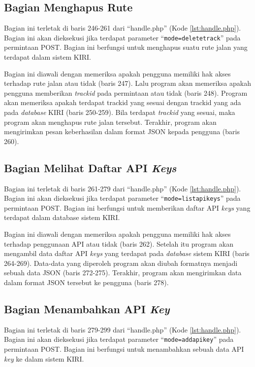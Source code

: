 \subsection{Bagian Menghapus Rute}
\label{sec:hapusrute}
Bagian ini terletak di baris 246-261 dari ``handle.php'' (Kode \ref{lst:handle.php}). Bagian ini akan dieksekusi jika terdapat parameter ``\texttt{mode=deletetrack}'' pada permintaan POST. Bagian ini berfungsi untuk menghapus suatu rute jalan yang terdapat dalam sistem KIRI.

Bagian ini diawali dengan memeriksa apakah pengguna memiliki hak akses terhadap rute jalan atau tidak (baris 247). Lalu program akan memeriksa apakah pengguna memberikan \textit{trackid} pada permintaan atau tidak (baris 248). Program akan memeriksa apakah terdapat {trackid} yang sesuai dengan {trackid} yang ada pada \textit{database} KIRI (baris 250-259). Bila terdapat \textit{trackid} yang sesuai, maka program akan menghapus rute jalan tersebut. Terakhir, program akan mengirimkan pesan keberhasilan dalam format JSON kepada pengguna (baris 260).

\subsection{Bagian Melihat Daftar API \textit{Keys}}
\label{sec:lihatapikeys}
Bagian ini terletak di baris 261-279 dari ``handle.php'' (Kode \ref{lst:handle.php}). Bagian ini akan dieksekusi jika terdapat parameter ``\texttt{mode=listapikeys}'' pada permintaan POST. Bagian ini berfungsi untuk memberikan daftar API \textit{keys} yang terdapat dalam database sistem KIRI.

Bagian ini diawali dengan memeriksa apakah pengguna memiliki hak akses terhadap penggunaan API atau tidak (baris 262). Setelah itu program akan mengambil data daftar API \textit{keys} yang terdapat pada \textit{database} sistem KIRI (baris 264-269). Data-data yang diperoleh program akan diubah formatnya menjadi sebuah data JSON (baris 272-275). Terakhir, program akan mengirimkan data dalam format JSON tersebut ke pengguna (baris 278).

\subsection{Bagian Menambahkan API \textit{Key}}
\label{sec:tambahapikey}
Bagian ini terletak di baris 279-299 dari ``handle.php'' (Kode \ref{lst:handle.php}). Bagian ini akan dieksekusi jika terdapat parameter ``\texttt{mode=addapikey}'' pada permintaan POST. Bagian ini berfungsi untuk menambahkan sebuah data API \textit{key} ke dalam sistem KIRI.

